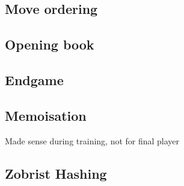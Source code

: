 \documentclass[a4paper,11pt]{article}
\begin{document}
\subsection{Move ordering}

\subsection{Opening book}

\subsection{Endgame}

\subsection{Memoisation}
Made sense during training, not for final player


\subsection{Zobrist Hashing}
\end{document}
